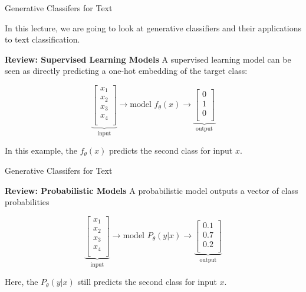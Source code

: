 \documentclass[../../main.tex]{subfiles}
\begin{document}
\begin{frame}[fragile]{Generative Classifers for Text}

In this lecture, we are going to look at generative classifiers and their applications to text classification.
\vspace{0.2cm}


\textbf{Review: Supervised Learning Models
}
A supervised learning model can be seen as directly predicting a one-hot embedding of the target class:

$$
\underbrace{\left[ 
\begin{array}{c}
x_1 \\
x_2 \\
x_3 \\
x_4 \\
\end{array}
\right]}_\text{input}
{\to}\text{model $f_\theta(x)$}{\to}
\underbrace{\left[ 
\begin{array}{c}
0 \\
1 \\
0 \\
\end{array}
\right]}_\text{output}
$$

In this example, the $f_\theta(x)$ predicts the second class for input $x$.


\end{frame}


\begin{frame}[fragile]{Generative Classifers for Text}



\textbf{Review: Probabilistic Models
}
A probabilistic model outputs a vector of class probabilities

$$
\underbrace{\left[ 
\begin{array}{c}
x_1 \\
x_2 \\
x_3 \\
x_4 \\
\end{array}
\right]}_\text{input}
{\to}\text{model $P_\theta(y|x)$}{\to}
\underbrace{\left[ 
\begin{array}{c}
0.1 \\
0.7 \\
0.2 \\
\end{array}
\right]}_\text{output}
$$

Here, the $P_\theta(y|x)$ still predicts the second class for input $x$.

\end{frame}
\end{document}
